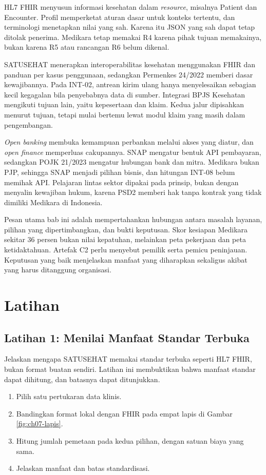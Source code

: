 HL7 FHIR menyusun informasi kesehatan dalam \textit{resource}, misalnya Patient dan Encounter. Profil memperketat
aturan dasar untuk konteks tertentu, dan terminologi menetapkan nilai yang sah. Karena itu JSON yang sah dapat tetap
ditolak penerima. Medikara tetap memakai R4 karena pihak tujuan memakainya, bukan karena R5 atau rancangan R6 belum
dikenal.

SATUSEHAT menerapkan interoperabilitas kesehatan menggunakan FHIR dan panduan per kasus penggunaan, sedangkan
Permenkes 24/2022 memberi dasar kewajibannya. Pada INT-02, antrean kirim ulang hanya menyelesaikan sebagian kecil
kegagalan bila penyebabnya data di sumber. Integrasi BPJS Kesehatan mengikuti tujuan lain, yaitu kepesertaan dan
klaim. Kedua jalur dipisahkan menurut tujuan, tetapi mulai bertemu lewat modul klaim yang masih dalam pengembangan.

\textit{Open banking} membuka kemampuan perbankan melalui akses yang diatur, dan \textit{open finance} memperluas
cakupannya. SNAP mengatur bentuk API pembayaran, sedangkan POJK 21/2023 mengatur hubungan bank dan mitra. Medikara
bukan PJP, sehingga SNAP menjadi pilihan bisnis, dan hitungan INT-08 belum memihak API. Pelajaran lintas sektor
dipakai pada prinsip, bukan dengan menyalin kewajiban hukum, karena PSD2 memberi hak tanpa kontrak yang tidak dimiliki
Medikara di Indonesia.

Pesan utama bab ini adalah mempertahankan hubungan antara masalah layanan, pilihan yang dipertimbangkan, dan bukti
keputusan. Skor kesiapan Medikara sekitar 36 persen bukan nilai kepatuhan, melainkan peta pekerjaan dan peta
ketidaktahuan. Artefak C2 perlu menyebut pemilik serta pemicu peninjauan. Keputusan yang baik menjelaskan manfaat yang
diharapkan sekaligus akibat yang harus ditanggung organisasi.

\section{Latihan}

\subsection*{Latihan 1: Menilai Manfaat Standar Terbuka}

Jelaskan mengapa SATUSEHAT memakai standar terbuka seperti HL7 FHIR, bukan format buatan sendiri. Latihan ini
membuktikan bahwa manfaat standar dapat dihitung, dan batasnya dapat ditunjukkan.
\begin{enumerate}
  \item Pilih satu pertukaran data klinis.
  \item Bandingkan format lokal dengan FHIR pada empat lapis di Gambar \ref{fig:ch07-lapis}.
  \item Hitung jumlah pemetaan pada kedua pilihan, dengan satuan biaya yang sama.
  \item Jelaskan manfaat dan batas standardisasi.
\end{enumerate}

